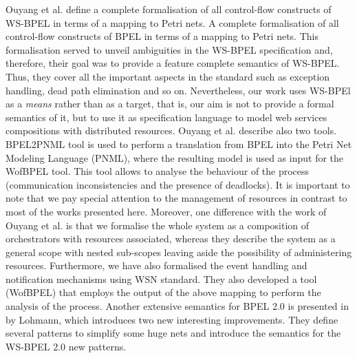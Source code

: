 Ouyang et al. \cite{Ouyang2007} define a complete formalisation of all control-flow constructs of WS-BPEL in terms of a mapping to Petri nets.
A complete formalisation of all control-flow constructs of BPEL in terms of a mapping to Petri nets.
This formalisation served to unveil ambiguities in the WS-BPEL specification and, therefore, their goal was to provide a feature complete semantics of WS-BPEL.
Thus, they cover all the important aspects in the standard such as exception handling, dead path elimination and so on. Nevertheless, our work uses WS-BPEl as a \emph{means} rather than as a target, that is, our aim is not to provide a formal semantics of it, but to use it as specification language to model web services compositions with distributed resources. 
Ouyang et al. describe also two tools. BPEL2PNML tool is used to perform a
translation from BPEL into the Petri Net Modeling Language (PNML), where the
resulting model is used as input for the WofBPEL tool. This tool allows to analyse the behaviour of the process (communication inconsistencies and the presence of deadlocks). It is important to note that we pay special attention to the management of resources in contrast to most of the works presented here. Moreover, one difference with the work of Ouyang et al. is that we formalise the whole
system as a composition of orchestrators with resources associated, whereas they describe the system as a general scope with nested sub-scopes leaving aside the possibility of administering resources. Furthermore, we have also formalised the event handling and notification mechanisms using WSN standard. 
They also developed a tool (WofBPEL) that employs the output of the above mapping to perform  the analysis of the process.  
Another extensive semantics for BPEL 2.0
is presented in \cite{Lohmann07} by Lohmann, which introduces two new interesting improvements. They define several patterns to simplify some huge nets and introduce the semantics for the WS-BPEL 2.0 new patterns.

